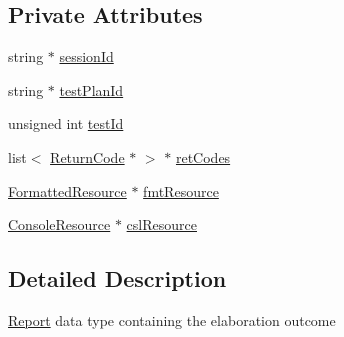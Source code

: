 \subsection*{Private Attributes}
\begin{DoxyCompactItemize}
\item 
string $\ast$ \hyperlink{classit_1_1testbench_1_1data_1_1Report_add363a3f8077b011675f79a2d39f58de}{session\-Id}
\item 
string $\ast$ \hyperlink{classit_1_1testbench_1_1data_1_1Report_ae2746165d3df8a1dcd390547b95e9516}{test\-Plan\-Id}
\item 
unsigned int \hyperlink{classit_1_1testbench_1_1data_1_1Report_af8e8837646af6eeb142e49d33440dc07}{test\-Id}
\item 
list$<$ \hyperlink{structit_1_1testbench_1_1data_1_1ReturnCode}{Return\-Code} $\ast$ $>$ $\ast$ \hyperlink{classit_1_1testbench_1_1data_1_1Report_acc1760bcf43858c4413c6fe9b0e065f6}{ret\-Codes}
\item 
\hyperlink{structit_1_1testbench_1_1data_1_1FormattedResource}{Formatted\-Resource} $\ast$ \hyperlink{classit_1_1testbench_1_1data_1_1Report_aecafa007878d7edeceaad1584d6f9914}{fmt\-Resource}
\item 
\hyperlink{structit_1_1testbench_1_1data_1_1ConsoleResource}{Console\-Resource} $\ast$ \hyperlink{classit_1_1testbench_1_1data_1_1Report_a922e94df83d2f49d39cf03c99f6e60ff}{csl\-Resource}
\end{DoxyCompactItemize}


\subsection{Detailed Description}
\hyperlink{classit_1_1testbench_1_1data_1_1Report}{Report} data type containing the elaboration outcome 

